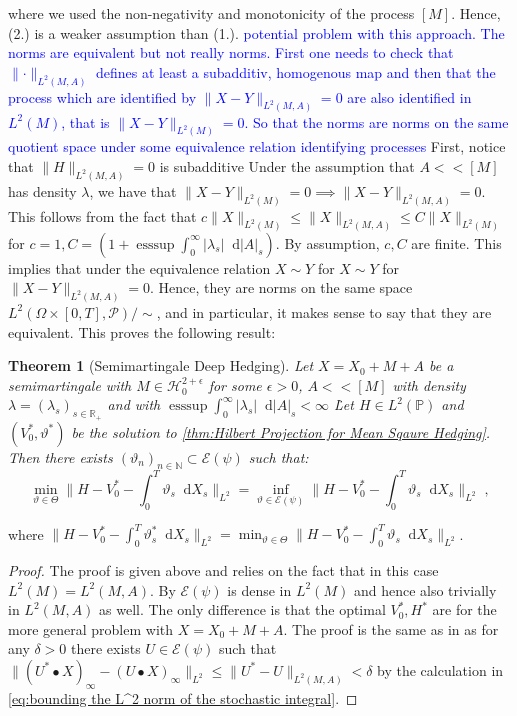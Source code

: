 \documentclass[11pt]{report}
\newcommand{\diff}{\mathop{}\!\mathrm{d}}
\theoremstyle{plain} %
\newtheorem{theorem}{Theorem}[chapter]
\theoremstyle{definition} %
\theoremstyle{remark} %
\begin{document}
where we used the non-negativity and monotonicity of the process \([M]\). Hence, (2.) is a weaker assumption than (1.).
\textcolor{blue}{potential problem with this approach. The norms are equivalent but not really norms. First one needs to check that \(\lVert \cdot\rVert_{L^2(M,A)}\) defines at least a subadditiv, homogenous map and then that the process which are identified by \(\lVert X-Y\rVert_{L^2(M,A)}=0\) are also identified in \(L^2(M)\), that is \(\lVert X-Y\rVert_{L^2(M)}=0\). So that the norms are norms on the same quotient space under some equivalence relation identifying processes}
First, notice that \(\lVert H\rVert_{L^2(M,A)}=0\) is subadditive
Under the assumption that \(A<<[M]\) has density \(\lambda\), we have that \(\lVert X-Y\rVert_{L^2(M)}=0\implies\lVert X-Y\rVert_{L^2(M,A)}=0\). This follows from the fact that \(c\lVert X\rVert_{L^2(M)}\leq\lVert X\rVert_{L^2(M,A)}\leq C\lVert X\rVert_{L^2(M)}\) for \(c=1,C=(1+\operatorname*{ess\sup}\int_0^{\infty}|\lambda_s|\diff |A|_s)\). By assumption, \(c,C\) are finite. This implies that under the equivalence relation \(X\sim Y\) for \(X\sim Y\) for \(\lVert X-Y\rVert_{L^2(M,A)}=0\). Hence, they are norms on the same space \(L^2(\Omega\times [0,T],\mathcal{P})/\sim\), and in particular, it makes sense to say that they are equivalent. 
\bigbreak
This proves the following result:
\begin{theorem}[Semimartingale Deep Hedging]\label{thm:general deep hedging}
    Let \(X=X_0+M+A\) be a semimartingale with \(M\in \mathcal{H}_{0}^{2+\epsilon}\) for some \(\epsilon>0\), \(A<<[M]\) with density \(\lambda=(\lambda_s)_{s\in\mathbb{R}_+}\) and with \(\operatorname*{ess\sup}\int_0^{\infty}|\lambda_s|\diff |A|_s<\infty\) \. Let \(H\in L^2(\mathbb{P})\) and \((V_0^*,\vartheta^*)\) be the solution to \cref{thm:Hilbert Projection for Mean Sqaure Hedging}. Then there exists \((\vartheta_n)_{n\in\mathbb{N}}\subset\mathcal{E}(\mathcal{\psi})\) such that:
    \begin{equation}
        \min_{\vartheta\in \Theta}\lVert H-V_0^*-\int_{0}^T\vartheta_s\diff X_s\rVert_{L^2}=\inf_{\vartheta\in\mathcal{E}(\psi)}\lVert H-V_0^*-\int_{0}^T\vartheta_s\diff X_s\rVert_{L^2}\;,
    \end{equation}
\end{theorem}
where \(\lVert H-V_0^*-\int_{0}^T\vartheta^*_s\diff X_s\rVert_{L^2}=\min_{\vartheta\in \Theta}\lVert H-V_0^*-\int_{0}^T\vartheta_s\diff X_s\rVert_{L^2}\).
\begin{proof}
    The proof is given above and relies on the fact that in this case \(L^2(M)=L^2(M,A)\). By \parencite[Thm.~5.32]{Arandjelovic2025} \(\mathcal{E}(\psi)\) is dense in \(L^2(M)\) and hence also trivially in \(L^2(M,A)\) as well. The only difference is that the optimal \(V_0^*,H^*\) are for the more general problem with \(X= X_0+M+A\). The proof is the same as in \parencite[THm.~5.35]{Arandjelovic2025} as for any \(\delta>0\) there exists \(U\in\mathcal{E}(\psi)\) such that \(\lVert(U^*\bullet X)_{\infty}-(U\bullet X)_{\infty}\rVert_{L^2}\leq \lVert U^*-U\rVert_{L^2(M,A)}<\delta\) by the calculation in \cref{eq:bounding the L^2 norm of the stochastic integral}.
\end{proof}
\end{document}
